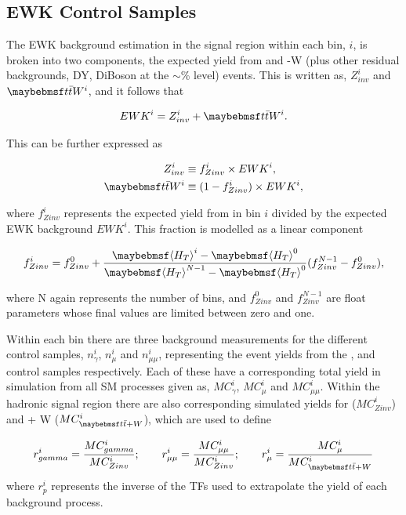 \subsection{\ac{EWK} Control Samples}
\label{subsec:ewkmodel}

The \ac{EWK} background estimation in the signal region within each bin, $i$, is broken into two components, the expected yield from \zinv and \ttbar-W (plus other residual backgrounds, DY, DiBoson at the $\sim$\% level) events. This is written as, $Z^{i}_{inv}$ and $\ttbar W^{i}$, and it follows that 

\begin{equation}
EWK^{i} = Z^{i}_{inv} + \ttbar W^{i}.
\end{equation}

This can be further expressed as

\begin{align}
\label{eq:zinvcontribution}
Z^{i}_{inv} &\equiv f^{i}_{Zinv} \times EWK^{i}, \\
\label{eq:ttwcontribution}
\ttbar W^{i} &\equiv (1 - f^{i}_{Zinv}) \times EWK^{i},
\end{align}

where $f^{i}_{Zinv}$ represents the expected yield from \zinv in bin $i$ divided by the expected \ac{EWK} background $EWK^{i}$. This fraction is modelled as a linear component

\begin{equation}
f^{i}_{Zinv} = f^{0}_{Zinv} + \frac{\meanht^{i}-\meanht^{0}}{\meanht^{N-1}-\meanht^{0}}(f^{N-1}_{Zinv} - f^{0}_{Zinv}),
\end{equation}

where N again represents the number of \theht bins, and $f^{0}_{Zinv}$ and $f^{N-1}_{Zinv}$ are float parameters whose final values are limited between zero and one. 

Within each \theht bin there are three background measurements for the different control samples, $n^{i}_{\gamma}$, $n^{i}_{\mu}$ and $n^{i}_{\mu\mu}$, representing the event yields from the \gpjets, \mupjets and \dimupjets control samples respectively. Each of these have a corresponding total yield in simulation from all \ac{SM} processes given as, $MC^{i}_{\gamma}$, $MC^{i}_{\mu}$ and $MC^{i}_{\mu\mu}$.  Within the hadronic signal region there are also corresponding simulated yields for \zinv ($MC^{i}_{Zinv}$) and \ttbar + W ($MC^{i}_{\ttbar+W}$), which are used to define

\begin{equation}
r^{i}_{\gamma} = \frac{MC^{i}_{\gamma}}{MC^{i}_{Zinv}}; \qquad r^{i}_{\mu\mu} = \frac{MC^{i}_{\mu\mu}}{MC^{i}_{Zinv}}; \qquad r^{i}_{\mu} = \frac{MC^{i}_{\mu}}{MC^{i}_{\ttbar + W}} 
\end{equation}
where $r^{i}_{p}$ represents the inverse of the \ac{TF}s used to extrapolate the yield of each background process.

